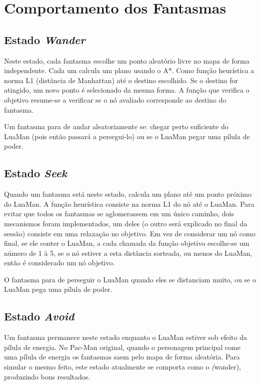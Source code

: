 \documentclass[a4paper]{scrartcl}
\begin{document}
\section{Comportamento dos Fantasmas}

\subsection{Estado \textit{Wander}}

Neste estado, cada fantasma escolhe um ponto aleatório livre no mapa de forma independente.
Cada um calcula um plano usando o A*. Como função heurística a norma L1 (distância de Manhattan)
até o destino escolhido. Se o destino for atingido, um novo ponto é selecionado da mesma forma.
A função que verifica o objetivo resume-se a verificar se o nó avaliado corresponde ao destino do
fantasma.

Um fantasma para de andar aleatoriamente se: chegar perto suficiente do LuaMan
(pois então passará a persegui-lo) ou se o LuaMan pegar uma pílula de poder.

\subsection{Estado \textit{Seek}}

Quando um fantasma está neste estado, calcula um plano até um ponto próximo do LuaMan.
A função heurística consiste na norma L1 do nó até o LuaMan. Para evitar que todos os fantasmas
se aglomerassem em um único caminho, dois mecanismos foram implementados, um deles (o outro será explicado no final da sessão) consiste em uma
relaxação no objetivo. Em vez de considerar um nó como final, se ele conter o LuaMan, a cada chamada
da função objetivo escolhe-se um número de 1 à 5, se o nó estiver a esta distância sorteada, ou menos
do LuaMan, então é considerado um nó objetivo.

O fantasma para de perseguir o LuaMan quando eles se distanciam muito, ou se o LuaMan pega uma pílula de poder.

\subsection{Estado \textit{Avoid}}

Um fantasma permanece neste estado enquanto o LuaMan estiver sob efeito da pílula de energia.
No Pac-Man original, quando o personagem principal come uma pílula de energia os fantasmas saem
pelo mapa de forma aleatória. Para simular o mesmo feito, este estado atualmente se comporta como
o \textit(wander), produzindo bons resultados.
\end{document}
